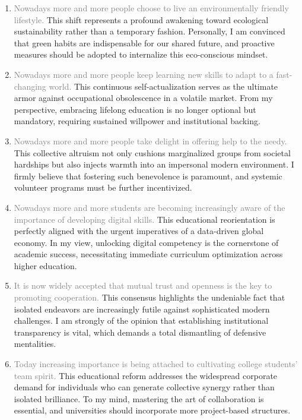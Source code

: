 ﻿\documentclass[lang=cn,11pt]{elegantbook}
\begin{document}
\begin{enumerate}
    \item \textcolor{gray}{Nowadays more and more people choose to live an environmentally friendly lifestyle.} This shift represents a profound awakening toward ecological sustainability rather than a temporary fashion. Personally, I am convinced that green habits are indispensable for our shared future, and proactive measures should be adopted to internalize this eco-conscious mindset.
    \item \textcolor{gray}{Nowadays more and more people keep learning new skills to adapt to a fast-changing world. }This continuous self-actualization serves as the ultimate armor against occupational obsolescence in a volatile market. From my perspective, embracing lifelong education is no longer optional but mandatory, requiring sustained willpower and institutional backing.
    \item \textcolor{gray}{Nowadays more and more people take delight in offering help to the needy.} This collective altruism not only cushions marginalized groups from societal hardships but also injects warmth into an impersonal modern environment. I firmly believe that fostering such benevolence is paramount, and systemic volunteer programs must be further incentivized.
    \item \textcolor{gray}{Nowadays more and more students are becoming increasingly aware of the importance of developing digital skills.} This educational reorientation is perfectly aligned with the urgent imperatives of a data-driven global economy. In my view, unlocking digital competency is the cornerstone of academic success, necessitating immediate curriculum optimization across higher education.
    \item \textcolor{gray}{It is now widely accepted that mutual trust and openness is the key to promoting cooperation.} This consensus highlights the undeniable fact that isolated endeavors are increasingly futile against sophisticated modern challenges. I am strongly of the opinion that establishing institutional transparency is vital, which demands a total dismantling of defensive mentalities.
    \item \textcolor{gray}{Today increasing importance is being attached to cultivating college students' team spirit.} This educational reform addresses the widespread corporate demand for individuals who can generate collective synergy rather than isolated brilliance. To my mind, mastering the art of collaboration is essential, and universities should incorporate more project-based structures.

\end{enumerate}
\end{document}

